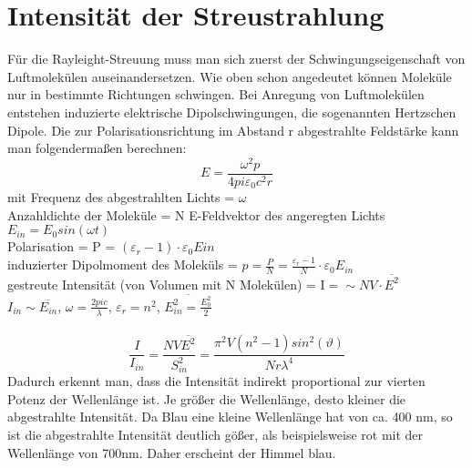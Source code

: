 

\section{ Intensität der Streustrahlung}
Für die Rayleight-Streuung muss man sich zuerst der Schwingungseigenschaft von Luftmolekülen auseinandersetzen. Wie oben schon angedeutet können Moleküle nur in bestimmte Richtungen schwingen. Bei Anregung von Luftmolekülen entstehen induzierte elektrische Dipolschwingungen, die sogenannten Hertzschen Dipole. 
Die zur Polarisationsrichtung im Abstand r abgestrahlte Feldstärke kann man folgendermaßen berechnen:
\begin{equation}
E=\frac{\omega^2p}{4pi\varepsilon_0c^2r}
\end{equation}
mit Frequenz des abgestrahlten Lichts = $\omega$\\
Anzahldichte der Moleküle = N
E-Feldvektor des angeregten Lichts $E_{in}=E_0sin(\omega t)$\\
Polarisation = P = $(\varepsilon_r-1)\cdot\varepsilon_0E{in}$\\
induzierter Dipolmoment des Moleküls = $p=\frac{P}{N}=\frac{\varepsilon_r-1}{N}\cdot\varepsilon_0E_{in}$\\
gestreute Intensität (von Volumen mit N Molekülen) = I$=\sim NV\cdot\overline{E^2}$\\
$I_{in}\sim\overline{E_{in}}$, $\omega=\frac{2pic}{\lambda}$, $\varepsilon_r=n^2$, $\overline{E^2_{in}=\frac{E_0^2}{2}}$  \\\\
\begin{equation}
\frac{I}{I_{in}}=\frac{NV\overline{E^2}}{S^2_{in}}=\frac{\pi^2V(n^2-1)sin^2(\vartheta)}{Nr\lambda^4}
\end{equation}
Dadurch erkennt man, dass die Intensität indirekt proportional zur vierten Potenz der Wellenlänge ist. Je größer die Wellenlänge, desto kleiner die abgestrahlte Intensität. Da Blau eine kleine Wellenlänge hat von ca. 400 nm, so ist die abgestrahlte Intensität deutlich gößer, als beispielsweise rot mit der Wellenlänge von 700nm.  Daher erscheint der Himmel blau. 


